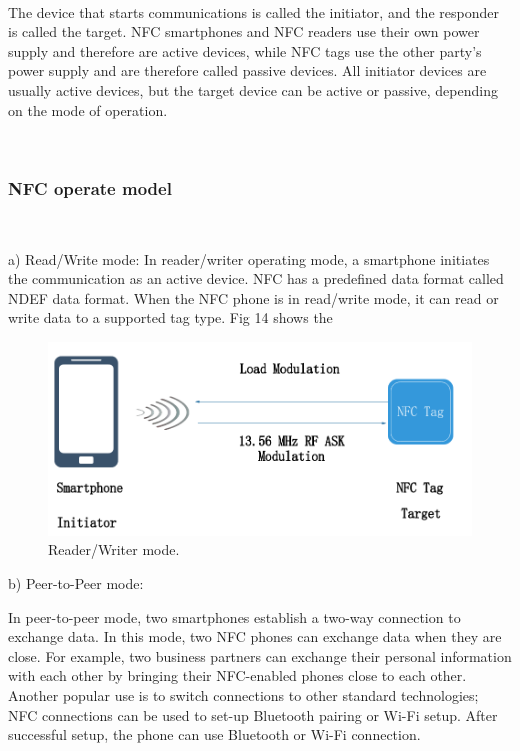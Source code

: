 \documentclass[journal]{IEEEtran}
\begin{document}
\

The device that starts communications is called the initiator, and the responder is called the target. NFC smartphones and NFC readers use their own power supply and therefore are active devices, while NFC tags use the other party's power supply and are therefore called passive devices. All initiator devices are usually active devices, but the target device can be active or passive, depending on the mode of operation.

\

\subsubsection{NFC operate model}

\

a) Read/Write mode:
In reader/writer operating mode, a smartphone initiates the communication as an active device. NFC has a predefined data format called NDEF data format. When the NFC phone is in read/write mode, it can read or write data to a supported tag type. Fig 14 shows the 




\begin{figure}[htbp]
\centerline{\includegraphics[scale=0.25]{Reader_Writer_mode.png}}
\caption{Reader/Writer mode.}
\label{fig}
\end{figure}



b) Peer-to-Peer mode:


In peer-to-peer mode, two smartphones establish a two-way connection to exchange data. In this mode, two NFC phones can exchange data when they are close. For example, two business partners can exchange their personal information with each other by bringing their NFC-enabled phones close to each other. Another popular use is to switch connections to other standard technologies; NFC connections can be used to set-up Bluetooth pairing or Wi-Fi setup. After successful setup, the phone can use Bluetooth or Wi-Fi connection.
\end{document}
